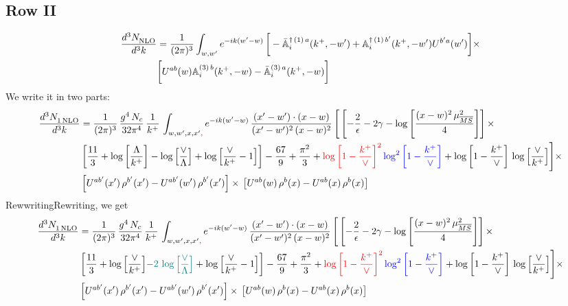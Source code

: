 \documentclass[9pt]{article}
\def\mf#1{\mathbb{#1}}
\numberwithin{equation}{section}
\begin{document}
\subsection{Row II}
\begin{align}
    \frac{d^{3}N_{\rm NLO}^{\rm}}{d^{3}k} &  = \frac{1}{(2\pi)^{3}}  \int_{w, w^\prime} e^{-ik(w^\prime-w)}\,\bigg[-\bar{\mf{A}}^{\dagger\,(1)\,a}_{i}(k^{+},-w^{\prime})+\mf{A}^{\dagger\, (1)\, b^{\prime}}_{i}(k^{+},-w^{\prime})U^{b^{\prime}a}(w^{\prime})\bigg]\times \notag \\ & \bigg[U^{ab}(w)\mf{A}^{(3)\, b}_{i}(k^{+},- w)-\Bar{\mf{A}}^{(3)\, a}_{i}(k^{+}, - w)\bigg]\nonumber
\end{align}
We write it in two parts: 
\begin{align}
     \frac{d^{3}N_{1\,\rm NLO}^{\rm}}{d^{3}k} &  = \frac{1}{(2\pi)^{3}}\, \frac{g^{4}\,N_{c}}{32\pi^{4}}\,\frac{1}{k^{+}}\, \int_{w, w',x,x'{\color{red},}} e^{-ik(w^\prime-w)}\, \frac{(x'-w')\cdot (x-w)}{(x'-w')^{2}\, (x-w)^{2}}\, \Bigg[\left[-\frac{2}{\epsilon}-2\gamma-\log{\left[\frac{(x-w)^{2}\,\mu^{2}_{\overline{MS}}}{4}\right]}\right]\times \notag \\ & \left[\frac{11}{3}+\log{\left[\frac{\Lambda}{k^{+}}\right]}-\log{\left[\frac{\vee}{\Lambda}\right]}+\log{\left[\frac{\vee}{k^{+}}-1\right]}\right]-\frac{67}{9}+\frac{\pi^{2}}{3}+{\color{red}\log{\left[1-\frac{k^{+}}{\vee}\right]^{2}}}\,{\color{blue}\log^{2}{\left[1-\frac{k^{+}}{\vee}\right]}}+\log{\left[1-\frac{k^{+}}{\vee}\right]}\,\log{\left[\frac{\vee}{k^{+}}\right]}\Bigg]\times\notag \\ & \left[U^{ab'}(x')\,\rho^{b'}(x') - U^{ab'}(w')\,\rho^{b'}(x')\right]\times\,\left[U^{ab}(w)\,\rho^{b}(x) - U^{ab}(x)\,\rho^{b}(x)\right]
\end{align}
{\color{red}Rewwriting}{\color{blue}Rewriting}, we get
\begin{align}
     \frac{d^{3}N_{1\,\rm NLO}^{\rm}}{d^{3}k} &  = \frac{1}{(2\pi)^{3}}\, \frac{g^{4}\,N_{c}}{32\pi^{4}}\,\frac{1}{k^{+}}\, \int_{w, w',x,x'{\color{red},}} e^{-ik(w^\prime-w)}\, \frac{(x'-w')\cdot (x-w)}{(x'-w')^{2}\, (x-w)^{2}}\, \Bigg[\left[-\frac{2}{\epsilon}-2\gamma-\log{\left[\frac{(x-w)^{2}\,\mu^{2}_{\overline{MS}}}{4}\right]}\right]\times \notag \\ & \left[\frac{11}{3}+\log{\left[\frac{\vee}{k^{+}}\right]}{\color{teal}-2\,\log{\left[\frac{\vee}{\Lambda}\right]}}+\log{\left[\frac{\vee}{k^{+}}-1\right]}\right]-\frac{67}{9}+\frac{\pi^{2}}{3}+{\color{red}\log{\left[1-\frac{k^{+}}{\vee}\right]^{2}}}\,{\color{blue}\log^{2}{\left[1-\frac{k^{+}}{\vee}\right]}}+\log{\left[1-\frac{k^{+}}{\vee}\right]}\,\log{\left[\frac{\vee}{k^{+}}\right]}\Bigg]\times\notag \\ & \left[U^{ab'}(x')\,\rho^{b'}(x') - U^{ab'}(w')\,\rho^{b'}(x')\right]\times\,\left[U^{ab}(w)\,\rho^{b}(x) - U^{ab}(x)\,\rho^{b}(x)\right]
\end{align}
\end{document}
